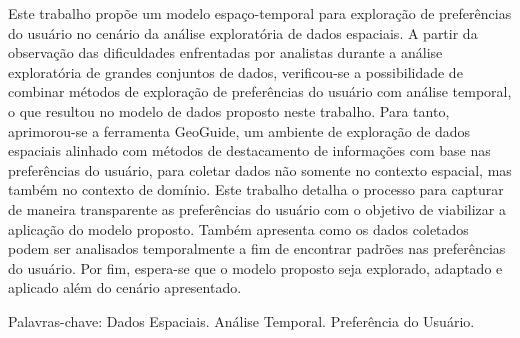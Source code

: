 






\begin{resumo}
	Este trabalho propõe um modelo espaço-temporal para exploração de preferências do usuário no cenário da análise exploratória de dados espaciais. A partir da observação das dificuldades enfrentadas por analistas durante a análise exploratória de grandes conjuntos de dados, verificou-se a possibilidade de combinar métodos de exploração de preferências do usuário com análise temporal, o que resultou no modelo de dados proposto neste trabalho. Para tanto, aprimorou-se a ferramenta GeoGuide, um ambiente de exploração de dados espaciais alinhado com métodos de destacamento de informações com base nas preferências do usuário, para coletar dados não somente no contexto espacial, mas também no contexto de domínio. Este trabalho detalha o processo para capturar de maneira transparente as preferências do usuário com o objetivo de viabilizar a aplicação do modelo proposto. Também apresenta como os dados coletados podem ser analisados temporalmente a fim de encontrar padrões nas preferências do usuário. Por fim, espera-se que o modelo proposto seja explorado, adaptado e aplicado além do cenário apresentado.


  \noindent
  {Palavras-chave}: Dados Espaciais. Análise Temporal. Preferência do Usuário.
\end{resumo}